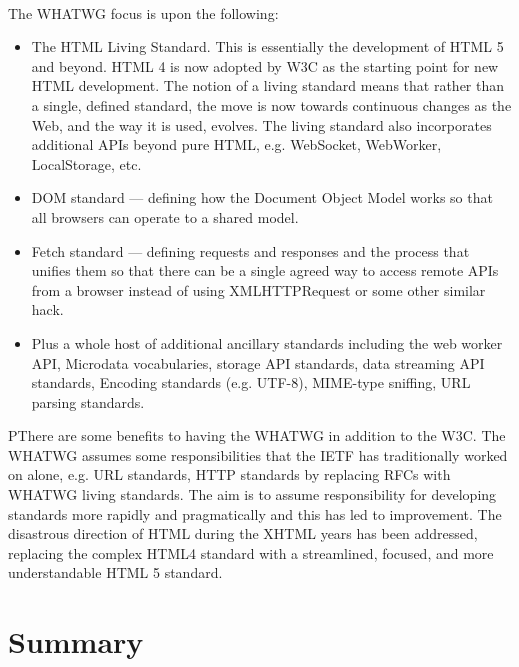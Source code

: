 \paragraph{} The WHATWG focus is upon the following:

\begin{itemize}
\item The HTML Living Standard. This is essentially the development of HTML 5 and beyond. HTML 4 is now adopted by W3C as the starting point for new HTML development. The notion of a living standard means that rather than a single, defined standard, the move is now towards continuous changes as the Web, and the way it is used, evolves. The living standard also incorporates additional APIs beyond pure HTML, e.g. WebSocket, WebWorker, LocalStorage, etc.
\item DOM standard — defining how the Document Object Model works so that all browsers can operate to a shared model.
\item Fetch standard — defining requests and responses and the process that unifies them so that there can be a single agreed way to access remote APIs from a browser instead of using XMLHTTPRequest or some other similar hack.
\item Plus a whole host of additional ancillary standards including the web worker API, Microdata vocabularies, storage API standards, data streaming API standards, Encoding standards (e.g. UTF-8), MIME-type sniffing, URL parsing standards.
\end{itemize}

PThere are some benefits to having the WHATWG in addition to the W3C. The WHATWG assumes some responsibilities that the IETF has traditionally worked on alone, e.g. URL standards, HTTP standards by replacing RFCs with WHATWG living standards. The aim is to assume responsibility for developing standards more rapidly and pragmatically and this has led to improvement. The disastrous direction of HTML during the XHTML years has been addressed, replacing the complex HTML4 standard with a streamlined, focused, and more understandable HTML 5 standard.


\section{Summary}
